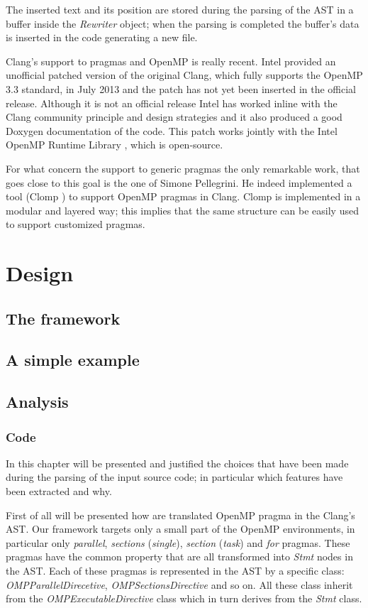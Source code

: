 \documentclass[a4paper,11pt,oneside]{book}
\begin{document}
The inserted text and its position are stored during the parsing of the AST in a buffer inside the \emph{Rewriter} object; when the parsing is completed the buffer’s data is inserted in the code generating a new file. 

Clang’s support to pragmas and OpenMP is really recent. Intel provided an unofficial patched version of the original Clang, which fully supports the OpenMP 3.3 standard, in July 2013 and the patch has not yet been inserted in the official release. Although it is not an official release Intel has worked inline with the Clang community principle and design strategies and it also produced a good Doxygen documentation of the code. This patch works jointly with the Intel OpenMP Runtime Library \cite{intelomprtl}, which is open-source. 

For what concern the support to generic pragmas the only remarkable work, that goes close to this goal is the one of Simone Pellegrini. He indeed implemented a tool (Clomp \cite{clomp}) to support OpenMP pragmas in Clang. Clomp is implemented in a modular and layered way; this implies that the same structure can be easily used to support customized pragmas.
 


\chapter{Design}
\section{The framework}
\section{A simple example}
\section{Analysis}
\subsection{Code}

In this chapter will be presented and justified the choices that have been made during the parsing of the input source code; in particular which features have been extracted and why.

First of all will be presented how are translated OpenMP pragma in the Clang’s AST. Our framework targets only a small part of the OpenMP environments, in particular only \emph{parallel}, \emph{sections} (\emph{single}), \emph{section} (\emph{task}) and \emph{for} pragmas. These pragmas have the common property that are all transformed into \emph{Stmt} nodes in the AST. Each of these pragmas is represented in the AST by a specific class: \emph{OMPParallelDirecetive}, \emph{OMPSectionsDirective} and so on. All these class inherit from the \emph{OMPExecutableDirective} class which in turn derives from the \emph{Stmt} class. 
\end{document}
